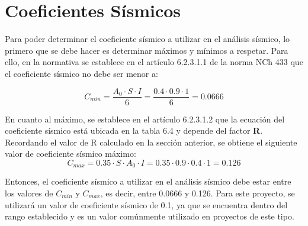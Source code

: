 \section{Coeficientes Sísmicos}

Para poder determinar el coeficiente sísmico a utilizar en el análisis sísmico, lo primero que se debe hacer es determinar máximos y mínimos a respetar. Para ello, en la normativa se establece en el artículo 6.2.3.1.1 de la norma NCh 433 \cite{NCh433:1996} que el coeficiente sísmico no debe ser menor a:

\begin{equation}
    C_{min} = \frac{A_0 \cdot S \cdot I}{6} = \frac{0.4 \cdot 0.9 \cdot 1}{6}= 0.0666
\end{equation}

En cuanto al máximo, se establece en el artículo 6.2.3.1.2 que la ecuación del coeficiente sísmico está ubicada en la tabla 6.4 y depende del factor \textbf{R}. Recordando el valor de R calculado en la sección anterior, se obtiene el siguiente valor de coeficiente sísmico máximo:
\begin{equation}
    C_{max} = 0.35 \cdot S \cdot A_0 \cdot I = 0.35 \cdot 0.9 \cdot 0.4 \cdot 1 = 0.126
\end{equation}

Entonces, el coeficiente sísmico a utilizar en el análisis sísmico debe estar entre los valores de $C_{min}$ y $C_{max}$, es decir, entre 0.0666 y 0.126. Para este proyecto, se utilizará un valor de coeficiente sísmico de 0.1, ya que se encuentra dentro del rango establecido y es un valor comúnmente utilizado en proyectos de este tipo.